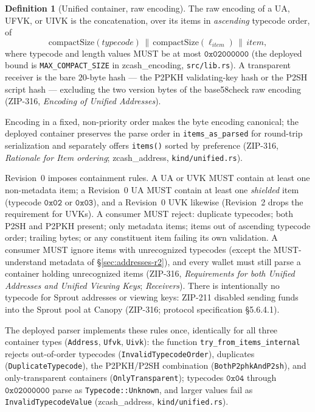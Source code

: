 \documentclass[11pt,a4paper]{article}
\theoremstyle{definition}
\newtheorem{definition}[theorem]{Definition}
\begin{document}
\begin{definition}[Unified container, raw encoding]\label{def:ua-raw}
The raw encoding of a UA, UFVK, or UIVK is the concatenation, over its
items in \emph{ascending} typecode order, of
\[
\mathrm{compactSize}(\mathit{typecode}) \,\|\,
\mathrm{compactSize}(\ell_{\mathit{item}}) \,\|\, \mathit{item},
\]
where typecode and length values MUST be at most $\mathtt{0x02000000}$
(the deployed bound is \texttt{MAX\_COMPACT\_SIZE} in
\textsf{zcash\_encoding}, \texttt{src/lib.rs}). A transparent receiver is
the bare $20$-byte hash --- the P2PKH validating-key hash or the P2SH
script hash --- excluding the two version bytes of the base58check raw
encoding (ZIP-316, \emph{Encoding of Unified Addresses}).
\end{definition}

Encoding in a fixed, non-priority order makes the byte encoding canonical;
the deployed container preserves the parse order in
\texttt{items\_as\_parsed} for round-trip serialization and separately
offers \texttt{items()} sorted by preference (ZIP-316, \emph{Rationale for
Item ordering}; \textsf{zcash\_address}, \texttt{kind/unified.rs}).

Revision~0 imposes containment rules. A UA or UVK MUST contain at least
one non-metadata item; a Revision~0 UA MUST contain at least one
\emph{shielded} item (typecode $\mathtt{0x02}$ or $\mathtt{0x03}$), and a
Revision~0 UVK likewise (Revision~2 drops the requirement for UVKs). A
consumer MUST reject: duplicate typecodes; both P2SH and P2PKH present;
only metadata items; items out of ascending typecode order; trailing
bytes; or any constituent item failing its own validation. A consumer MUST
ignore items with unrecognized typecodes (except the MUST-understand
metadata of \S\ref{sec:addresses-r2}), and every wallet must still parse a
container holding unrecognized items (ZIP-316, \emph{Requirements for both
Unified Addresses and Unified Viewing Keys}; \emph{Receivers}). There is
intentionally no typecode for Sprout addresses or viewing keys: ZIP-211
disabled sending funds into the Sprout pool at Canopy (ZIP-316; protocol
specification \S5.6.4.1).

The deployed parser implements these rules once, identically for all three
container types (\texttt{Address}, \texttt{Ufvk}, \texttt{Uivk}): the
function \texttt{try\_from\_items\_internal} rejects out-of-order
typecodes (\texttt{InvalidTypecodeOrder}), duplicates
(\texttt{DuplicateTypecode}), the P2PKH/P2SH combination
(\texttt{BothP2phkAndP2sh}), and only-transparent containers
(\texttt{OnlyTransparent}); typecodes $\mathtt{0x04}$ through
$\mathtt{0x02000000}$ parse as \texttt{Typecode::Unknown}, and larger
values fail as \texttt{InvalidTypecodeValue} (\textsf{zcash\_address},
\texttt{kind/unified.rs}).
\end{document}
